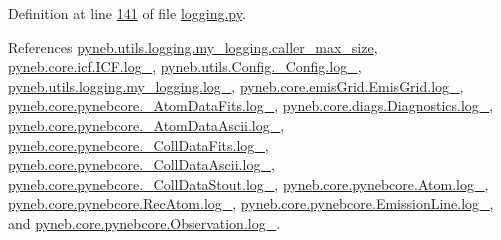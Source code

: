 Definition at line \hyperlink{logging_8py_source_l00141}{141} of file \hyperlink{logging_8py_source}{logging.\-py}.



References \hyperlink{logging_8py_source_l00040}{pyneb.\-utils.\-logging.\-my\-\_\-logging.\-caller\-\_\-max\-\_\-size}, \hyperlink{icf_8py_source_l00015}{pyneb.\-core.\-icf.\-I\-C\-F.\-log\-\_\-}, \hyperlink{_config_8py_source_l00031}{pyneb.\-utils.\-Config.\-\_\-\-Config.\-log\-\_\-}, \hyperlink{logging_8py_source_l00033}{pyneb.\-utils.\-logging.\-my\-\_\-logging.\-log\-\_\-}, \hyperlink{emis_grid_8py_source_l00043}{pyneb.\-core.\-emis\-Grid.\-Emis\-Grid.\-log\-\_\-}, \hyperlink{pynebcore_8py_source_l00087}{pyneb.\-core.\-pynebcore.\-\_\-\-Atom\-Data\-Fits.\-log\-\_\-}, \hyperlink{diags_8py_source_l00168}{pyneb.\-core.\-diags.\-Diagnostics.\-log\-\_\-}, \hyperlink{pynebcore_8py_source_l00308}{pyneb.\-core.\-pynebcore.\-\_\-\-Atom\-Data\-Ascii.\-log\-\_\-}, \hyperlink{pynebcore_8py_source_l00574}{pyneb.\-core.\-pynebcore.\-\_\-\-Coll\-Data\-Fits.\-log\-\_\-}, \hyperlink{pynebcore_8py_source_l00923}{pyneb.\-core.\-pynebcore.\-\_\-\-Coll\-Data\-Ascii.\-log\-\_\-}, \hyperlink{pynebcore_8py_source_l01155}{pyneb.\-core.\-pynebcore.\-\_\-\-Coll\-Data\-Stout.\-log\-\_\-}, \hyperlink{pynebcore_8py_source_l01216}{pyneb.\-core.\-pynebcore.\-Atom.\-log\-\_\-}, \hyperlink{pynebcore_8py_source_l02633}{pyneb.\-core.\-pynebcore.\-Rec\-Atom.\-log\-\_\-}, \hyperlink{pynebcore_8py_source_l03384}{pyneb.\-core.\-pynebcore.\-Emission\-Line.\-log\-\_\-}, and \hyperlink{pynebcore_8py_source_l03540}{pyneb.\-core.\-pynebcore.\-Observation.\-log\-\_\-}.


